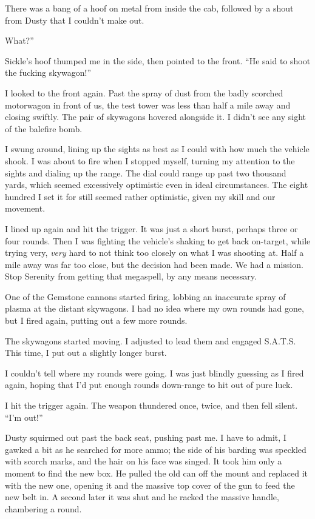 There was a bang of a hoof on metal from inside the cab, followed by a shout from Dusty that I couldn’t make out.

\leavevmode{}What?”

Sickle’s hoof thumped me in the side, then pointed to the front. “He said to shoot the fucking skywagon!”

I looked to the front again. Past the spray of dust from the badly scorched motorwagon in front of us, the test tower was less than half a mile away and closing swiftly. The pair of skywagons hovered alongside it. I didn’t see any sight of the balefire bomb.

I swung around, lining up the sights as best as I could with how much the vehicle shook. I was about to fire when I stopped myself, turning my attention to the sights and dialing up the range. The dial could range up past two thousand yards, which seemed excessively optimistic even in ideal circumstances. The eight hundred I set it for still seemed rather optimistic, given my skill and our movement.

I lined up again and hit the trigger. It was just a short burst, perhaps three or four rounds. Then I was fighting the vehicle’s shaking to get back on-target, while trying very, \textit{very} hard to not think too closely on what I was shooting at. Half a mile away was far too close, but the decision had been made. We had a mission. Stop Serenity from getting that megaspell, by any means necessary.

One of the Gemstone cannons started firing, lobbing an inaccurate spray of plasma at the distant skywagons. I had no idea where my own rounds had gone, but I fired again, putting out a few more rounds.

The skywagons started moving. I adjusted to lead them and engaged S.A.T.S. This time, I put out a slightly longer burst.

I couldn’t tell where my rounds were going. I was just blindly guessing as I fired again, hoping that I’d put enough rounds down-range to hit out of pure luck.

I hit the trigger again. The weapon thundered once, twice, and then fell silent. “I’m out!”

Dusty squirmed out past the back seat, pushing past me. I have to admit, I gawked a bit as he searched for more ammo; the side of his barding was speckled with scorch marks, and the hair on his face was singed. It took him only a moment to find the new box. He pulled the old can off the mount and replaced it with the new one, opening it and the massive top cover of the gun to feed the new belt in. A second later it was shut and he racked the massive handle, chambering a round.

